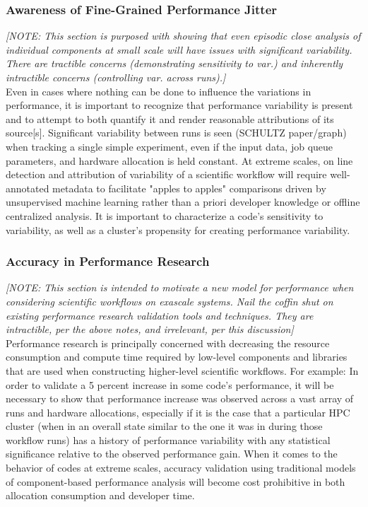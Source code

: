 \documentclass[10pt, conference, compsocconf]{IEEEtran}
\begin{document}
\subsubsection{Awareness of Fine-Grained Performance Jitter}
\textit{[NOTE: This section is purposed with showing that even episodic 
close analysis of individual components at small scale will have issues with 
significant variability. There are tractible 
concerns (demonstrating sensitivity to var.) and inherently intractible 
concerns (controlling var. across runs).]}\\
Even in cases where nothing can be done to influence the variations in 
performance, it is important to recognize that performance variability is 
present and to  attempt to both quantify it and render reasonable attributions 
of its source[s]. Significant variability between runs is seen (SCHULTZ 
paper/graph) when tracking a single simple experiment, even if the input data, 
job queue  parameters, and hardware allocation is held constant. At extreme 
scales, on line detection and attribution of variability of a 
scientific workflow will require well-annotated metadata to facilitate "apples 
to apples" comparisons driven by unsupervised machine learning rather than a 
priori developer knowledge or offline centralized analysis. It is important to 
characterize a code's sensitivity to variability, as well as a cluster's 
propensity for creating performance variability.
\subsubsection{Accuracy in Performance Research}
\textit{[NOTE: This section is intended to motivate a new model for 
performance when 
considering scientific workflows on exascale systems. Nail the coffin shut on 
existing performance research validation tools and techniques. They are 
intractible, per the above notes, and irrelevant, per this discussion]}\\
Performance research is principally concerned with decreasing the resource 
consumption and compute time required by low-level components and libraries 
that are used when constructing higher-level scientific workflows. For example: 
In order to 
validate a 5 percent increase in some code's performance, it will be necessary 
to show that  performance increase was observed across a vast array of runs and 
hardware allocations, especially if it is the case that a particular HPC 
cluster (when in an overall state similar to the one it was in during those 
workflow runs) has a history of performance variability with any statistical 
significance relative to the observed performance gain. When it comes to the 
behavior of codes at extreme scales, accuracy validation using traditional 
models of component-based performance analysis will become cost prohibitive in 
both allocation consumption and developer time.
\end{document}
